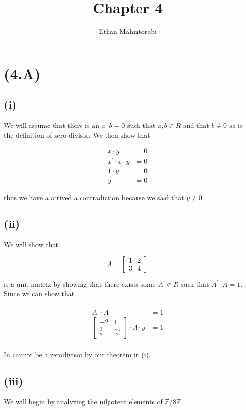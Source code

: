 \documentclass{article}
\begin{document}
  
  \title{Chapter 4}
  \author{Ethan Mahintorabi}
  
  \maketitle

  \section*{(4.A)}
    \subsection*{(i)}
    We will assume that there is an $a \cdot b = 0$ such that $a,b \in R$ and that $b \neq 0$ as is the definition of zero divisor. We then show that

    \begin{equation*}
      \begin{split}
        x \cdot y &= 0\\
        x^{\prime} \cdot x \cdot y &= 0\\
        1 \cdot y &= 0\\
        y &= 0
      \end{split}  
    \end{equation*}

    thus we have a arrived a contradiction because we said that $y \neq 0$.


    \subsection{(ii)}
    We will show that 

    \[
      A = \begin{bmatrix}
        1 & 2\\
        3 & 4
      \end{bmatrix}
    \]

    is a unit matrix by showing that there exists some $A^{\prime} \in R$ such that
    $A^{\prime} \cdot A = 1$. Since we can show that


    \begin{equation*}
      \begin{split}
        A^{\prime} \cdot A &= 1\\
        \begin{bmatrix}
          -2 & 1\\
          \frac{3}{2} & \frac{-1}{2}
        \end{bmatrix} \cdot A \cdot y &= 1\\
      \end{split}  
    \end{equation*}

    In cannot be a zerodivisor by our theorem in (i).


    \subsection{(iii)}
    We will begin by analyzing the nilpotent elements of $\mathbb{Z}/8\mathbb{Z}$
    
\end{document}
